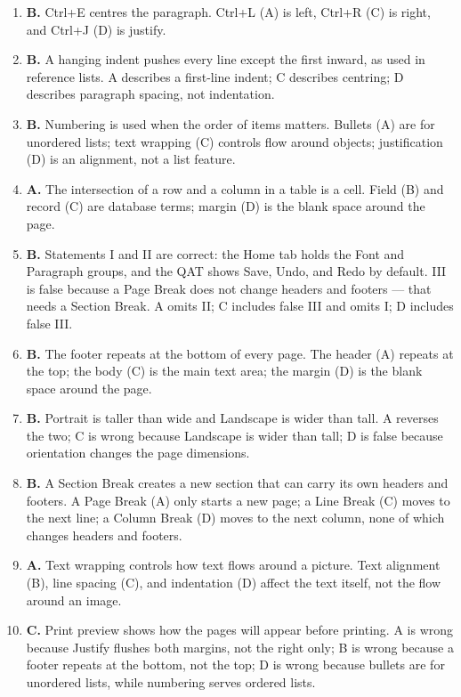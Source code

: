 \documentclass[11pt]{article}
\begin{document}
\begin{enumerate}[label=\textbf{Q\arabic*.}, leftmargin=*]
  Left (A) is flush on the left only, Right (C) on the right only, and
  Centre (B) places each line in the middle.
\item \textbf{B.} Ctrl+E centres the paragraph. Ctrl+L (A) is left, Ctrl+R
  (C) is right, and Ctrl+J (D) is justify.
\item \textbf{B.} A hanging indent pushes every line except the first inward,
  as used in reference lists. A describes a first-line indent; C describes
  centring; D describes paragraph spacing, not indentation.
\item \textbf{B.} Numbering is used when the order of items matters. Bullets
  (A) are for unordered lists; text wrapping (C) controls flow around
  objects; justification (D) is an alignment, not a list feature.
\item \textbf{A.} The intersection of a row and a column in a table is a
  cell. Field (B) and record (C) are database terms; margin (D) is the blank
  space around the page.
\item \textbf{B.} Statements I and II are correct: the Home tab holds the
  Font and Paragraph groups, and the QAT shows Save, Undo, and Redo by
  default. III is false because a Page Break does not change headers and
  footers --- that needs a Section Break. A omits II; C includes false III
  and omits I; D includes false III.
\item \textbf{B.} The footer repeats at the bottom of every page. The header
  (A) repeats at the top; the body (C) is the main text area; the margin (D)
  is the blank space around the page.
\item \textbf{B.} Portrait is taller than wide and Landscape is wider than
  tall. A reverses the two; C is wrong because Landscape is wider than tall;
  D is false because orientation changes the page dimensions.
\item \textbf{B.} A Section Break creates a new section that can carry its
  own headers and footers. A Page Break (A) only starts a new page; a Line
  Break (C) moves to the next line; a Column Break (D) moves to the next
  column, none of which changes headers and footers.
\item \textbf{A.} Text wrapping controls how text flows around a picture.
  Text alignment (B), line spacing (C), and indentation (D) affect the text
  itself, not the flow around an image.
\item \textbf{C.} Print preview shows how the pages will appear before
  printing. A is wrong because Justify flushes both margins, not the right
  only; B is wrong because a footer repeats at the bottom, not the top; D is
  wrong because bullets are for unordered lists, while numbering serves
  ordered lists.


\end{enumerate}
\end{document}
